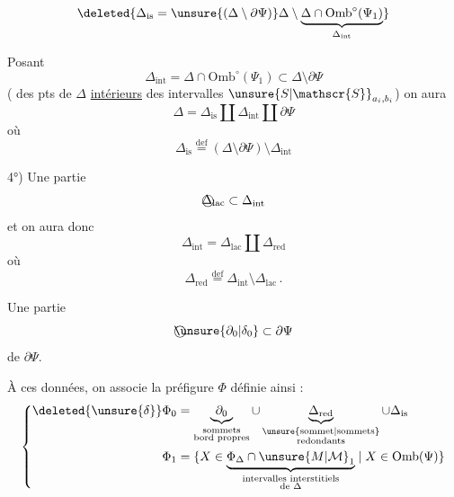 
\[
\deleted{\Delta_{\mathrm{is}}=\unsure{(\Delta\setminus\partial\Psi)}\Delta\setminus\underbrace{\Delta\cap\mathrm{Omb}^{\circ}(\Psi_1)}_{\Delta_{\mathrm{int}}}}
\]

Posant
\[
\Delta_{\mathrm{int}}=\Delta\cap\mathrm{Omb}^{\circ}(\Psi_1)\subset\Delta\setminus\partial\Psi
\]
( des pts de $\Delta$ \uline{intérieurs}   des intervalles $\unsure{S|\mathscr{S}}_{a_i,b_i}$) on aura
\[
\Delta=\Delta_{\mathrm{is}}\amalg\Delta_{\mathrm{int}}\amalg\partial\Psi
\]
où
\[
\Delta_{\mathrm{is}}\overset{\mathrm{def}}{=}(\Delta\setminus\partial\Psi)\setminus\Delta_{\mathrm{int}}
\]

4°) Une partie
\[
\text{\textcircled{$\Delta_{\mathrm{lac}}$}}\subset\Delta_{\mathrm{int}}
\]
et on  aura donc
\[
\Delta_{\mathrm{int}}=\Delta_{\mathrm{lac}}\amalg\Delta_{\mathrm{red}}
\]
où
\[
\Delta_{\mathrm{red}}\overset{\mathrm{def}}{=}\Delta_{\mathrm{int}}\setminus\Delta_{\mathrm{lac}}\,.
\]

 Une partie
\[
\text{\textcircled{$\unsure{\partial_0|\delta_0}$}}\subset\partial\Psi
\]
de $\partial\Psi$.

À ces données, on associe la préfigure $\Phi$ définie ainsi :
\[
\left\{\begin{aligned}
\deleted{\unsure{\delta}}\Phi_0&=\underbrace{\partial_0}_{\substack{\text{sommets}\\\text{bord propres}}}\cup\underbrace{\Delta_{\mathrm{red}}}_{\substack{\text{\unsure{sommet|sommets}}\\\text{redondants}}}\cup\Delta_{\mathrm{is}}\\
\Phi_1&=\{X\in\underbrace{\Phi_{\Delta}\cap\unsure{M|\mathcal{M}}_1}_{\substack{\text{intervalles interstitiels}\\\text{de }\Delta}}\mid X\in\mathrm{Omb}(\Psi)\}
\end{aligned}\right.
\]
